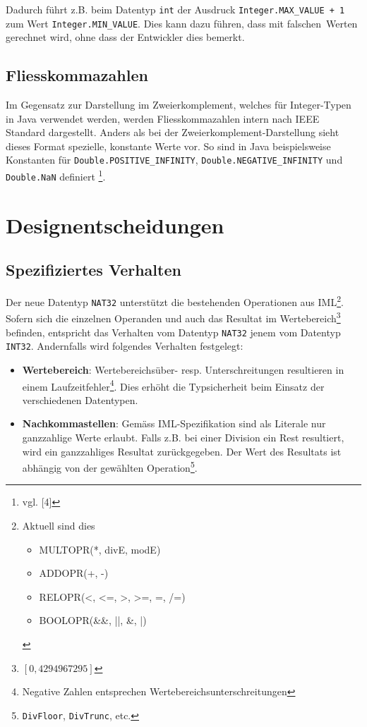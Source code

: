 \documentclass[10pt, a4paper, twocolumn]{article} %
\begin{document}
Dadurch führt z.B. beim Datentyp \texttt{int} der Ausdruck \texttt{Integer.MAX\_VALUE + 1} zum Wert \texttt{Integer.MIN\_VALUE}.
Dies kann dazu führen, dass mit \glqq falschen\grqq \ Werten gerechnet wird, ohne dass der Entwickler dies bemerkt.

\subsection{Fliesskommazahlen}
\label{ieee}
Im Gegensatz zur Darstellung im Zweierkomplement, welches für Integer-Typen in Java verwendet werden, werden Fliesskommazahlen intern nach IEEE Standard dargestellt.
Anders als bei der Zweierkomplement-Darstellung sieht dieses Format spezielle, konstante Werte vor.
So sind in Java beispielsweise Konstanten für \texttt{Double.POSITIVE\_INFINITY}, \texttt{Double.NEGATIVE\_INFINITY} und \texttt{Double.NaN} definiert \footnote{vgl. [4]}.

\section{Designentscheidungen}
\subsection{Spezifiziertes Verhalten}
Der neue Datentyp \texttt{NAT32} unterstützt die bestehenden Operationen aus IML\footnote{Aktuell sind dies \begin{itemize}
                                                                                                                \item MULTOPR(*, divE, modE) \item ADDOPR(+, -) \item RELOPR(<, <=, >, >=, =, /=) \item BOOLOPR(\&\&, ||, \&, |)
\end{itemize}}.
Sofern sich die einzelnen Operanden und auch das Resultat im Wertebereich\footnote{$[0,4294967295]$} befinden,
entspricht das Verhalten vom Datentyp \texttt{NAT32} jenem vom Datentyp \texttt{INT32}.
Andernfalls wird folgendes Verhalten festgelegt:

\begin{itemize}
    \item \textbf{Wertebereich}: Wertebereichsüber- resp. Unterschreitungen resultieren in einem Laufzeitfehler\footnote{Negative Zahlen entsprechen Wertebereichsunterschreitungen}. Dies erhöht die Typsicherheit beim Einsatz der verschiedenen Datentypen.
    \item \textbf{Nachkommastellen}: Gemäss IML-Spezifikation sind als Literale nur ganzzahlige Werte erlaubt. Falls z.B. bei einer Division ein Rest resultiert, wird ein ganzzahliges Resultat zurückgegeben. Der Wert des Resultats ist abhängig von der gewählten Operation\footnote{\texttt{DivFloor}, \texttt{DivTrunc}, etc.}.
\end{itemize}
\end{document}
